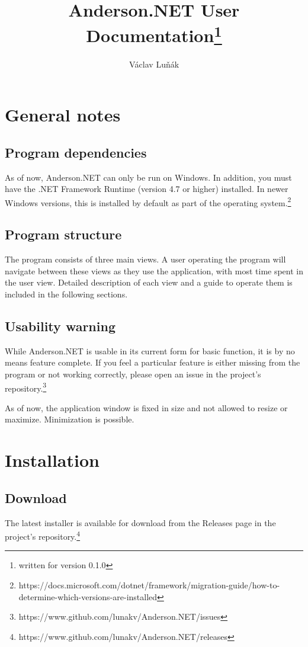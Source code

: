 \documentclass[titlepage]{scrartcl}
\title{Anderson.NET User Documentation\thanks{written for version 0.1.0}}
\author{Václav Luňák}
\begin{document}
\maketitle
\tableofcontents
\pagebreak
\section{General notes}
\subsection{Program dependencies}
As of now, Anderson.NET can only be run on Windows. In addition, you must have the .NET Framework Runtime (version 4.7 or higher) installed. In newer Windows versions, this is installed by default as part of the operating system.\footnote{https://docs.microsoft.com/dotnet/framework/migration-guide/how-to-determine-which-versions-are-installed}

\subsection{Program structure}
The program consists of three main views. A user operating the program will navigate between these views as they use the application, with most time spent in the user view. Detailed description of each view and a guide to operate them is included in the following sections. 

\subsection{Usability warning}
While Anderson.NET is usable in its current form for basic function, it is by no means feature complete. If you feel a particular feature is either missing from the program or not working correctly, please open an issue in the project's repository.\footnote{https://www.github.com/lunakv/Anderson.NET/issues}

As of now, the application window is fixed in size and not allowed to resize or maximize. Minimization is possible.

\section{Installation}
\subsection{Download}
The latest installer is available for download from the Releases page in the project's repository.\footnote{https://www.github.com/lunakv/Anderson.NET/releases}
\end{document}
